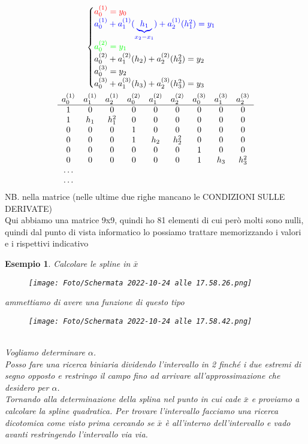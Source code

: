 \documentclass[a4paper, portrait]{book}
\numberwithin{equation}{chapter} %
\newtheorem{example}{Esempio}
\begin{document}
\begin{gather}
    \begin{cases}
        \color{red}{a_0^{(1)} = y_0}\\
        \color{blue}{a_0^{(1)}+a_1^{(1)}(\underbrace{h_1}_{x_2-x_1})+a_2^{(1)}(h_1^2) = y_1}\\
        \color{green}{a_0^{(2)}=y_1}\\
        a_0^{(2)} +a_1^{(2)}(h_2)+a_2^{(2)}(h_2^2) = y_2\\
        a_0^{(3)} = y_2\\
        a_0^{(3)} + a_1^{(3)}(h_3)+ a_2^{(3)}(h_3^2) = y_3
    \end{cases}\\
    \begin{matrix}
        a_0^{(1)}&a_1^{(1)}&a_2^{(1)}&a_0^{(2)}&a_1^{(2)}&a_2^{(2)}&a_0^{(3)}&a_1^{(3)}&a_2^{(3)}\\
        \hline
        1&0&0&0&0&0&0&0&0\\
        1&h_1&h_1^2&0&0&0&0&0&0\\
        0&0&0&1&0&0&0&0&0\\
        0&0&0&1&h_2&h_2^2&0&0&0\\
        0&0&0&0&0&0&1&0&0\\
        0&0&0&0&0&0&1&h_3&h_3^2\\
        \dots\\
        \dots
    \end{matrix}
\end{gather}
NB. nella matrice (nelle ultime due righe mancano le CONDIZIONI SULLE DERIVATE)\\
Qui abbiamo una matrice 9x9, quindi ho 81 elementi di cui però molti sono nulli, quindi dal punto di vista informatico lo possiamo trattare memorizzando i valori e i rispettivi indicativo
\begin{example}
    Calcolare le spline in $\bar{x}$\\
    \begin{figure}[h!]
        \centering
        \texttt{[image: Foto/Schermata 2022-10-24 alle 17.58.26.png]}
        \caption{}
    \end{figure}
    ammettiamo di avere una funzione di questo tipo
    \begin{figure}[h!]
        \centering
        \texttt{[image: Foto/Schermata 2022-10-24 alle 17.58.42.png]}
        \caption{}
    \end{figure}
    \\Vogliamo determinare $\alpha$.\\
    Posso fare una ricerca biniaria dividendo l'intervallo in 2 finché i due estremi di segno opposto e restringo il campo fino ad arrivare all'approssimazione che desidero per $\alpha$.\\
    Tornando alla determinazione della splina nel punto in cui cade $\bar{x}$ e proviamo a calcolare la spline quadratica. Per trovare l'intervallo facciamo una ricerca dicotomica come visto prima cercando se $\bar{x}$ è all'interno dell'intervallo e vado avanti restringendo l'intervallo via via.
\end{example}
\end{document}
